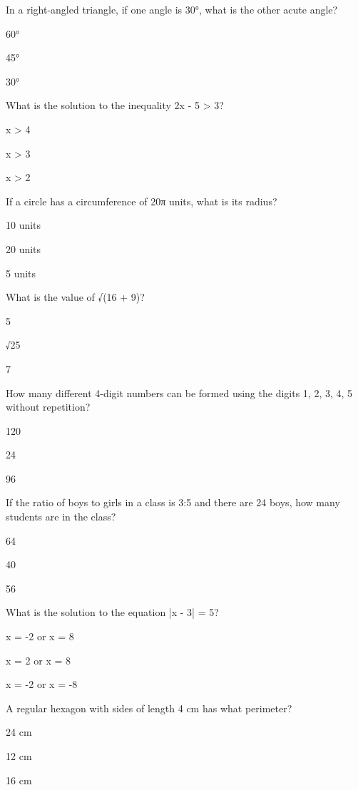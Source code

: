 \begin{enhancedmcq}{In a right-angled triangle, if one angle is 30°, what is the other acute angle?}
\item 60°
\item 45°
\item 30°

\end{enhancedmcq}
\begin{enhancedmcq}{What is the solution to the inequality 2x - 5 > 3?}
\item x > 4
\item x > 3
\item x > 2

\end{enhancedmcq}
\begin{enhancedmcq}{If a circle has a circumference of 20π units, what is its radius?}
\item 10 units
\item 20 units
\item 5 units

\end{enhancedmcq}
\begin{enhancedmcq}{What is the value of √(16 + 9)?}
\item 5
\item √25
\item 7

\end{enhancedmcq}
\begin{enhancedmcq}{How many different 4-digit numbers can be formed using the digits 1, 2, 3, 4, 5 without repetition?}
\item 120
\item 24
\item 96

\end{enhancedmcq}
\begin{enhancedmcq}{If the ratio of boys to girls in a class is 3:5 and there are 24 boys, how many students are in the class?}
\item 64
\item 40
\item 56

\end{enhancedmcq}
\begin{enhancedmcq}{What is the solution to the equation |x - 3| = 5?}
\item x = -2 or x = 8
\item x = 2 or x = 8
\item x = -2 or x = -8

\end{enhancedmcq}
\begin{enhancedmcq}{A regular hexagon with sides of length 4 cm has what perimeter?}
\item 24 cm
\item 12 cm
\item 16 cm
\end{enhancedmcq}